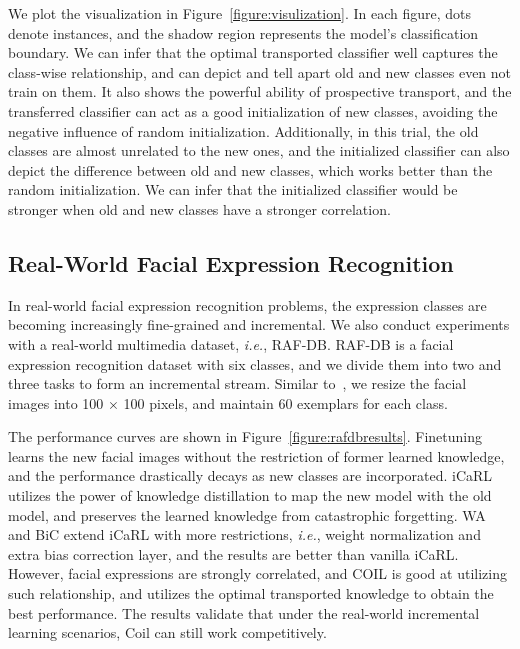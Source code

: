 \documentclass[sigconf]{acmart}
\newcommand{\ie}{\emph{i.e.}}
\newcommand{\name}{{\sc Coil }}
\begin{document}
We plot the visualization in Figure~\ref{figure:visulization}. 
In each figure, dots denote instances, and the shadow region represents the model's classification boundary. 
We can infer that the optimal transported classifier well captures the class-wise relationship, and can depict and tell apart old and new classes even not train on them. It also shows the powerful ability of prospective transport, and the transferred classifier can act as a good initialization of new classes, avoiding the negative influence of random initialization. Additionally, in this trial, the old classes are almost unrelated to the new ones, and the initialized classifier can also depict the difference between old and new classes, which works better than the random initialization. We can infer that the initialized classifier would be stronger when old and new classes have a stronger correlation.

\subsection{Real-World Facial Expression Recognition}

In real-world facial expression recognition problems, the expression classes are becoming increasingly fine-grained and incremental.
We also conduct experiments with a real-world multimedia dataset, \ie, RAF-DB. RAF-DB is a facial expression recognition dataset with six classes, and we divide them into two and three tasks to form an incremental stream. Similar to~\cite{zhu2020iexpressnet}, we resize the facial images into 100 $\times$ 100 pixels, and maintain 60 exemplars for each class.

The performance curves are shown in Figure~\ref{figure:rafdbresults}.
Finetuning learns the new facial images without the restriction of former learned knowledge, and the performance drastically decays as new classes are incorporated. iCaRL utilizes the power of knowledge distillation to map the new model with the old model, and preserves the learned knowledge from catastrophic forgetting. WA and BiC extend iCaRL with more restrictions, \ie, weight normalization and extra bias correction layer, and the results are better than vanilla iCaRL. 
However, facial expressions are strongly correlated, and COIL is good at utilizing such relationship, and utilizes the optimal transported knowledge to obtain the best performance. The results validate that under the real-world incremental learning scenarios, \name can still work competitively.
\end{document}
